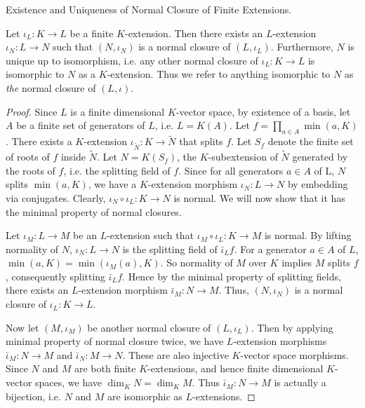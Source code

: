 \documentclass[../book.tex]{subfiles}
\begin{document}
\begin{thm} Existence and Uniqueness of Normal Closure of Finite Extensions.
    
    Let $\iota_L : K \to L$ be a finite $K$-extension. 
    Then there exists an $L$-extension $\iota_N : L \to N$ such that
    $(N,\iota_N)$ is a normal closure of $(L,\iota_L)$.
    Furthermore, $N$ is unique up to isomorphism, i.e.
    any other normal closure of $\iota_L : K \to L$ is
    isomorphic to $N$ as a $K$-extension. 
    Thus we refer to anything isomorphic to $N$ 
    as \emph{the} normal closure of $(L,\iota)$.
\end{thm}
\begin{proof}
    Since $L$ is a finite dimensional $K$-vector space,
    by existence of a basis,
    let $A$ be a finite set of generators of $L$, i.e. $L = K(A)$.
    Let $f = \prod_{a \in A} \min(a,K)$. 
    There exists a $K$-extension $\iota_{\tilde{N}} : K \to \tilde{N}$ 
    that splits $f$. 
    Let $S_f$ denote the finite set of roots of $f$ inside $\tilde{N}$.
    Let $N = K(S_f)$, the $K$-subextension of $\tilde{N}$ generated 
    by the roots of $f$, i.e. the splitting field of $f$. 
    Since for all generators $a \in A$ of L, $N$ splits $\min(a,K)$,
    we have a $K$-extension morphism $\iota_N : L \to N$ by embedding via conjugates.
    Clearly, $\iota_N\circ\iota_L : K \to N$ is normal. 
    We will now show that it has the minimal property of normal closures. 
    
    Let $\iota_M : L \to M$ be an $L$-extension such that 
    $\iota_M\circ\iota_L : K \to M$ is normal. 
    By lifting normality of $N$, 
    $\iota_N : L \to N$ is the splitting field of $\bar\iota_L f$. 
    For a generator $a\in A$ of $L$, $\min(a,K) = \min(\iota_M(a),K)$. 
    So normality of $M$ over $K$ implies $M$ splits $f$,
    consequently splitting $\bar\iota_L f$. 
    Hence by the minimal property of splitting fields,
    there exists an $L$-extension morphism $\bar\iota_M : N \to M$.
    Thus, $(N,\iota_N)$ is a normal closure of $\iota_L : K \to L$.
    
    Now let $(M,\iota_M)$ be another normal closure of $(L,\iota_L)$. 
    Then by applying minimal property of normal closure twice,
    we have $L$-extension morphisms $\bar\iota_M : N \to M$ 
    and $\bar\iota_N : M \to N$.
    These are also injective $K$-vector space morphisms.
    Since $N$ and $M$ are both finite $K$-extensions,
    and hence finite dimensional $K$-vector spaces, 
    we have $\dim_K N = \dim_K M$.
    Thus $\bar\iota_M : N \to M$ is actually a bijection,
    i.e. $N$ and $M$ are isomorphic as $L$-extensions. 
\end{proof}
\end{document}
